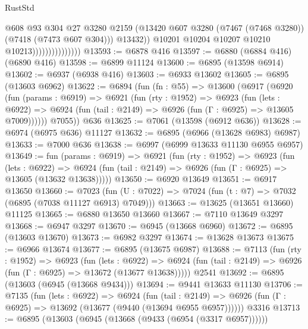 \begin{lexlean}{RustStd}
\begin{coremodule}
                                      @608
                                      @93
                                      @304
                                      @27
                                      @3280
                                      @2159
                                      (@13420
                                        @607
                                        @3280
                                        (@7467 (@7468 @3280))
                                        (@7418 (@7473 @607 @304)))
                                      @13432))
                                  @10201
                                  @10204
                                  @10207
                                  @10210
                                  @10213)))))))))))))))
@13593 := @6878 @416
@13597 := @6880 (@6884 @416) (@6890 @416)
@13598 := @6899 @11124
@13600 := @6895 (@13598 @6914)
@13602 := @6937 (@6938 @416)
@13603 := @6933 @13602
@13605 := @6895 (@13603 @6962)
@13622 := @6894
    (fun (fn : @55) =>
    @13600
      (@6917
        (@6920
          (fun (params : @6919) =>
          @6921
            (fun (rty : @1952) =>
            @6923
              (fun (lets : @6922) =>
              @6924 (fun (tail : @2149) => @6926 (fun (Γ : @6925) => @13605 @7009))))))
        @7055))
    @636
@13625 := @7061 (@13598 (@6912 @636))
@13628 := @6974 (@6975 @636) @11127
@13632 := @6895 (@6966 (@13628 @6983) @6987)
@13633 := @7000 @636
@13638 := @6997 (@6999 @13633 @11130 @6955 @6957)
@13649 := fun (params : @6919) =>
  @6921
    (fun (rty : @1952) =>
    @6923
      (fun (lets : @6922) =>
      @6924 (fun (tail : @2149) => @6926 (fun (Γ : @6925) => @13605 (@13632 @13638)))))
@13650 := @6920 @13649
@13651 := @6917 @13650
@13660 := @7023
    (fun (U : @7022) => @7024 (fun (t : @7) => @7032 (@6895 (@7038 @11127 @6913) @7049)))
@13663 := @13625 (@13651 @13660) @11125
@13665 := @6880 @13650 @13660
@13667 := @7110 @13649 @3297
@13668 := @6947 @3297
@13670 := @6945 (@13668 @6960)
@13672 := @6895 (@13603 @13670)
@13673 := @6982 @3297
@13674 := @13628 @13673
@13675 := @6966 @13674
@13677 := @6895 (@13675 @6987)
@13688 := @7113
    (fun (rty : @1952) =>
    @6923
      (fun (lets : @6922) =>
      @6924 (fun (tail : @2149) => @6926 (fun (Γ : @6925) => @13672 (@13677 @13638)))))
    @2541
@13692 := @6895 (@13603 (@6945 (@13668 @9434)))
@13694 := @9441 @13633 @11130
@13706 := @7135
    (fun (lets : @6922) =>
    @6924
      (fun (tail : @2149) =>
      @6926 (fun (Γ : @6925) => @13692 (@13677 (@9440 (@13694 @6955 @6957))))))
    @3316
@13713 := @6895 (@13603 (@6945 (@13668 (@9433 (@6954 (@3317 @6957))))))

\end{coremodule}
\end{lexlean}
